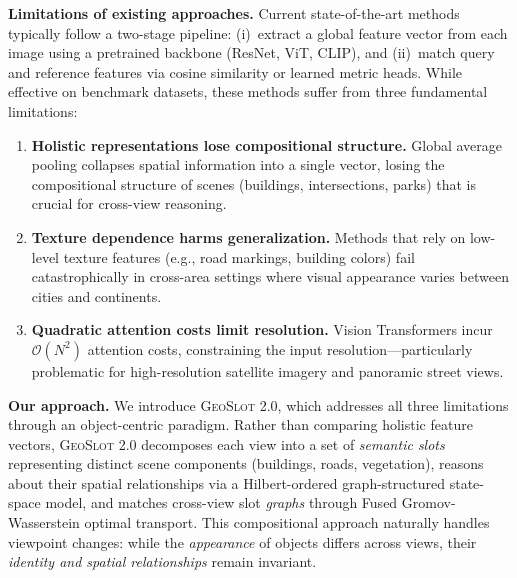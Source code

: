 \documentclass{article}
\newcommand{\oursv}{\textsc{GeoSlot 2.0}}
\begin{document}
\textbf{Limitations of existing approaches.} Current state-of-the-art methods~\cite{sample4geo,auxgeo,geodtr} typically follow a two-stage pipeline: (i)~extract a global feature vector from each image using a pretrained backbone (ResNet, ViT, CLIP), and (ii)~match query and reference features via cosine similarity or learned metric heads. While effective on benchmark datasets, these methods suffer from three fundamental limitations:

\begin{enumerate}[leftmargin=1.5em,topsep=0pt,itemsep=2pt]
    \item \textbf{Holistic representations lose compositional structure.} Global average pooling collapses spatial information into a single vector, losing the compositional structure of scenes (buildings, intersections, parks) that is crucial for cross-view reasoning.
    \item \textbf{Texture dependence harms generalization.} Methods that rely on low-level texture features (e.g., road markings, building colors) fail catastrophically in cross-area settings where visual appearance varies between cities and continents.
    \item \textbf{Quadratic attention costs limit resolution.} Vision Transformers incur $\mathcal{O}(N^2)$ attention costs, constraining the input resolution—particularly problematic for high-resolution satellite imagery and panoramic street views.
\end{enumerate}

\textbf{Our approach.} We introduce \oursv{}, which addresses all three limitations through an object-centric paradigm. Rather than comparing holistic feature vectors, \oursv{} decomposes each view into a set of \textit{semantic slots} representing distinct scene components (buildings, roads, vegetation), reasons about their spatial relationships via a Hilbert-ordered graph-structured state-space model, and matches cross-view slot \textit{graphs} through Fused Gromov-Wasserstein optimal transport. This compositional approach naturally handles viewpoint changes: while the \textit{appearance} of objects differs across views, their \textit{identity and spatial relationships} remain invariant.
\end{document}
